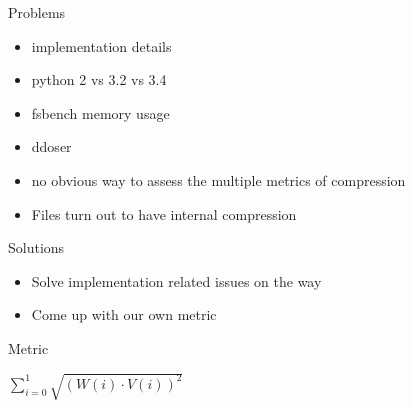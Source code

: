 \documentclass[10pt, compress]{beamer}
\begin{document}
\begin{frame}{Problems}
    \begin{itemize}
        \item implementation details
        \item python 2 vs 3.2 vs 3.4
        \item fsbench memory usage
        \item ddoser
        \item no obvious way to assess the multiple metrics of compression
        \item Files turn out to have internal compression
    \end{itemize}
\end{frame}

\begin{frame}{Solutions}
    \begin{itemize}
        \item Solve implementation related issues on the way
        \item Come up with our own metric
    \end{itemize}
\end{frame}

\begin{frame}{Metric}
    \begin{center}
        \(
        \sum\limits^{1}_{i=0} \sqrt{(W(i) \cdot V(i))^2}
        \)
    \end{center}
    \begin{table}
    \begin{center}
    \caption{Metric, Ratio : Compression speed : Decompression Speed}
    \label{tab:metric}
    \end{center}
    \end{table}

\end{frame}
\end{document}
